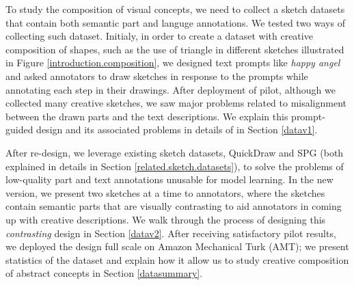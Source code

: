 To study the composition of visual concepts, we need to collect a sketch datasets that contain both semantic part and languge annotations. We tested two ways of collecting such dataset. Initialy, in order to create a dataset with creative composition of shapes, such as the use of triangle in different sketches illustrated in Figure \ref{introduction.composition}, we designed text prompts like \textit{happy angel} and asked annotators to draw sketches in response to the prompts while annotating each step in their drawings.  
After deployment of pilot, although we collected many creative sketches, we saw major problems related to misalignment between the drawn parts and the text descriptions. We explain this prompt-guided design and its associated problems in details of in Section \ref{datav1}.    

After re-design, we leverage existing sketch datasets, QuickDraw and SPG (both explained in details in Section \ref{related.sketch.datasets}), to solve the problems of low-quality part and text annotations unusable for model learning.    
In the new version, we present two sketches at a time to annotators, where the sketches contain semantic parts that are visually contrasting to aid annotators in coming up with creative descriptions. We walk through the process of designing this \textit{contrasting} design in Section \ref{datav2}. After receiving satisfactory pilot results, we deployed the design full scale on Amazon Mechanical Turk (AMT); we present statistics of the dataset and explain how it allow us to study creative composition of abstract concepts in Section \ref{datasummary}. 


